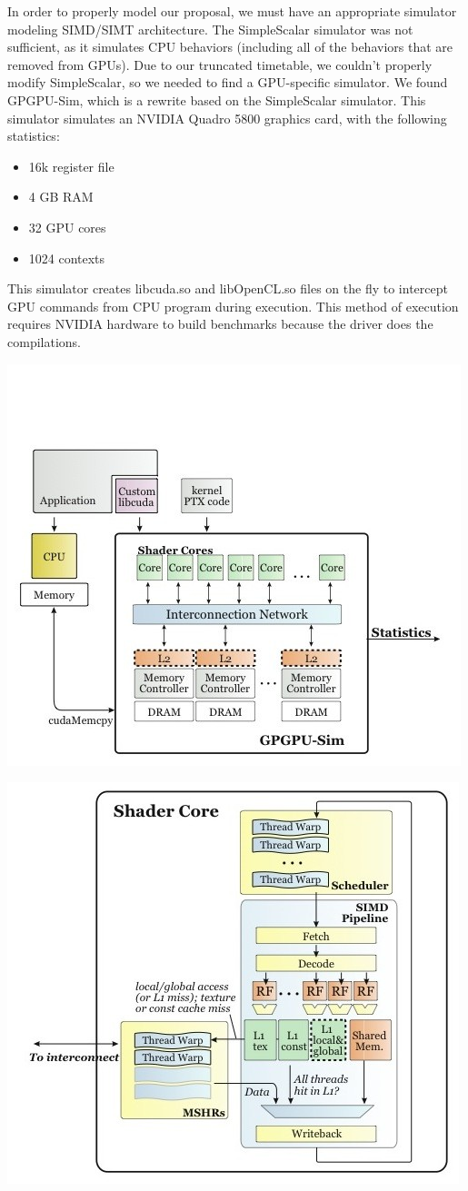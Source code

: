 \documentclass[conference]{IEEEtran}
\begin{document}
In order to properly model our proposal, we must have an appropriate simulator modeling SIMD/SIMT architecture.  The SimpleScalar simulator was not sufficient, as it simulates CPU behaviors (including all of the behaviors that are removed from GPUs).  Due to our truncated timetable, we couldn't properly modify SimpleScalar, so we needed to find a GPU-specific simulator.  We found GPGPU-Sim, which is a rewrite based on the SimpleScalar simulator.  This simulator simulates an NVIDIA Quadro 5800 graphics card, with the following statistics:

\begin{itemize}
	\item 16k register file
	\item 4 GB RAM
	\item 32 GPU cores
	\item 1024 contexts
\end{itemize}

This simulator creates libcuda.so and libOpenCL.so files on the fly to intercept GPU commands from CPU program during execution.  This method of execution requires NVIDIA hardware to build benchmarks because the driver does the compilations.

\begin{center}
	\includegraphics[width=.45\textwidth]{uarch1.jpg}
\end{center}

\begin{center}
	\includegraphics[width=.45\textwidth]{uarch2.jpg}
\end{center}
\end{document}
